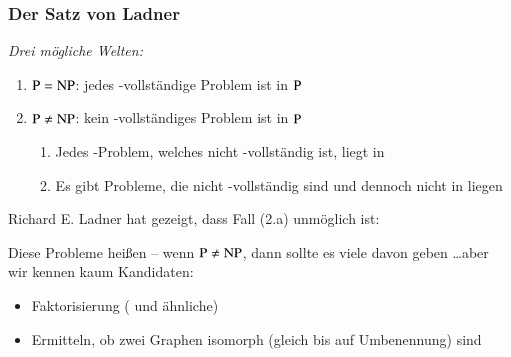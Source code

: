 \documentclass[aspectratio=1610,onlymath]{beamer}
\begin{document}
\begin{frame}\frametitle{Der Satz von Ladner}

\emph{Drei mögliche Welten:}
\begin{enumerate}[(1)]
\item ${\textsc{P}}={\textsc{NP}}$: jedes -vollständige Problem ist in ${\textsc{P}}$
\item ${\textsc{P}}\neq{\textsc{NP}}$: kein -vollständiges Problem ist in ${\textsc{P}}$
\begin{enumerate}[(2.a)]
\item Jedes -Problem, welches nicht -vollständig ist, liegt in 
\item Es gibt Probleme, die nicht -vollständig sind und dennoch nicht in  liegen
\end{enumerate}
\end{enumerate}\pause\bigskip

Richard E. Ladner hat gezeigt, dass Fall (2.a) unmöglich ist:


Diese Probleme heißen  \pause{} -- wenn ${\textsc{P}}\neq{\textsc{NP}}$, dann sollte es viele davon geben \ldots aber wir kennen kaum Kandidaten:
\begin{itemize}
\item Faktorisierung ( und ähnliche)
\item Ermitteln, ob zwei Graphen isomorph (gleich bis auf Umbenennung) sind
\end{itemize}


\end{frame}
\end{document}

